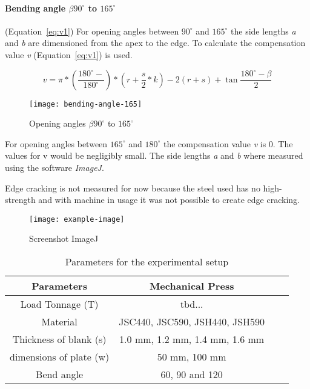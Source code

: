 \paragraph{Bending angle $\beta90^\circ$ to $165^\circ$} (Equation~\ref{eq:v1})
For opening angles between $90^\circ$ and $165^\circ$ the side lengths \textit{a} and \textit{b} are dimensioned from the apex to the edge. 
To calculate the compensation value \textit{v} (Equation~\ref{eq:v1}) is used. 
\cite{din6935}

\begin{equation}\label{eq:v2}
    v=\pi*(\frac{180^\circ-}{180^\circ})*(r+\frac{s}{2}*k)-2(r+s)+\tan{\frac{180^\circ-\beta}{2}}
\end{equation}

\begin{figure}[!ht]
	\centering
	\texttt{[image: bending-angle-165]}
	\caption[Opening angles $\beta90^\circ$ to $165^\circ$]{Opening angles $\beta90^\circ$ to $165^\circ$ \cite{din6935}}
	\label{fig:v2-image}
\end{figure}

For opening angles between $165^\circ$ and $180^\circ$ the compensation value \textit{v} is 0. The values for v would be negligibly small. \cite{din6935} The side lengths \textit{a} and \textit{b} where measured using the software \textit{ImageJ}. 

Edge cracking is not measured for now because the steel used has no high-strength and with machine in usage it was not possible to create edge cracking.

\begin{figure}[!ht]
	\centering
	\texttt{[image: example-image]}
	\caption[Screenshot ImageJ]{Screenshot ImageJ}
	\label{fig:imagej-screenshot}
\end{figure}



\begin{table}[ht!]
\centering
    \begin{tabular}{ |c|c|c|c| } 
        \hline
        Parameters & Mechanical Press \\
        \hline
        Load Tonnage (T) & tbd... \\
        Material & JSC440, JSC590, JSH440, JSH590 \\
        Thickness of blank (s) & 1.0 mm, 1.2 mm, 1.4 mm, 1.6 mm \\ 
        dimensions of plate (w) & 50 mm, 100 mm \\ 
        Bend angle & 60, 90 and 120 \\
        \hline
    \end{tabular}
    \caption{Parameters for the experimental setup}
\end{table}




